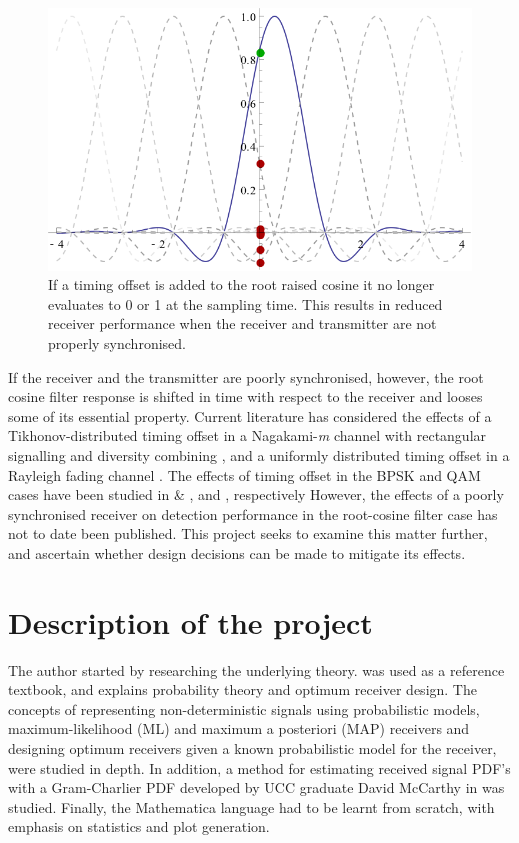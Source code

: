 \begin{figure}[htbp]
\centering
\includegraphics[width=\linewidth]{rrc_err.png}
\caption{If a timing offset is added to the root raised cosine it no
longer evaluates to 0 or 1 at the sampling time. This results in
reduced receiver performance when the receiver and transmitter are not
properly synchronised.}
\end{figure}

If the receiver and the transmitter are poorly synchronised, however,
the root cosine filter response is shifted in time with respect to the
receiver and looses some of its essential property. Current literature
has considered the effects of a Tikhonov-distributed timing offset in a Nagakami-\emph{m} channel with rectangular signalling and diversity combining \cite{[2]}, and a uniformly distributed timing offset in a Rayleigh fading channel \cite{[6]}. The effects of timing offset in the BPSK and QAM cases have been studied in \cite{[3]} \& \cite{[4]}, and \cite{[5]}, respectively However, the effects of a poorly synchronised receiver on detection performance in the root-cosine filter case has not to date been published. This project seeks to examine this matter further, and ascertain whether design decisions can be made to mitigate its effects.

\chapter{Description of the project}

The author started by researching the underlying theory. \cite{[8]} was used as a reference textbook, and explains probability theory and optimum receiver design. The concepts of representing non-deterministic signals using probabilistic models,  maximum-likelihood (ML) and maximum a posteriori (MAP) receivers and designing optimum receivers given a known probabilistic model for the receiver, were studied in depth. In addition, a method for estimating received signal PDF's with a Gram-Charlier PDF developed by UCC graduate David McCarthy in \cite{[1]} was studied. Finally, the Mathematica language had to be learnt from scratch, with emphasis on statistics and plot generation.

